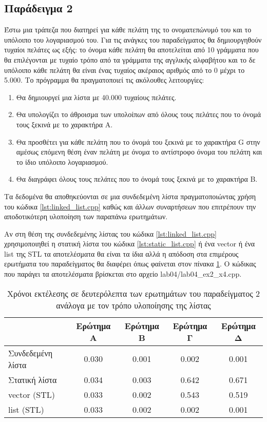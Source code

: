 \subsection{Παράδειγμα 2}
Έστω μια τράπεζα που διατηρεί για κάθε πελάτη της το ονοματεπώνυμό του και το υπόλοιπο του λογαριασμού του. Για τις ανάγκες του παραδείγματος θα δημιουργηθούν τυχαίοι πελάτες ως εξής: το όνομα κάθε πελάτη θα αποτελείται από 10 γράμματα που θα επιλέγονται με τυχαίο τρόπο από τα γράμματα της αγγλικής αλφαβήτου και το δε υπόλοιπο κάθε πελάτη θα είναι ένας τυχαίος ακέραιος αριθμός από το 0 μέχρι το 5.000. Το πρόγραμμα θα πραγματοποιεί τις ακόλουθες λειτουργίες: 
\begin{enumerate}[noitemsep,label=\Alph*]
\item Θα δημιουργεί μια λίστα με 40.000 τυχαίους πελάτες.
\item Θα υπολογίζει το άθροισμα των υπολοίπων από όλους τους πελάτες που το όνομά τους ξεκινά με το χαρακτήρα Α.
\item Θα προσθέτει για κάθε πελάτη που το όνομά του ξεκινά με το χαρακτήρα G στην αμέσως επόμενη θέση έναν πελάτη με όνομα το αντίστροφο όνομα του πελάτη και το ίδιο υπόλοιπο λογαριασμού.
\item Θα διαγράφει όλους τους πελάτες που το όνομά τους ξεκινά με το χαρακτήρα Β.
\end{enumerate}
Τα δεδομένα θα αποθηκεύονται σε μια συνδεδεμένη λίστα πραγματοποιώντας χρήση του κώδικα \ref{lst:linked_list.cpp} καθώς και άλλων συναρτήσεων που επιτρέπουν την αποδοτικότερη υλοποίηση των παραπάνω ερωτημάτων.





Αν στη θέση της συνδεδεμένης λίστας του κώδικα \ref{lst:linked_list.cpp} χρησιμοποιηθεί η στατική λίστα του κώδικα \ref{lst:static_list.cpp} ή ένα vector ή ένα list της STL τα αποτελέσματα θα είναι τα ίδια αλλά η απόδοση στα επιμέρους ερωτήματα του παραδείγματος θα διαφέρει όπως φαίνεται στον πίνακα \ref{tbl:lists}. Ο κώδικας που παράγει τα αποτελέσματα βρίσκεται στο αρχείο lab04/lab04\_ex2\_x4.cpp.

\begin{table}[!htb]
\centering
\begin{tabular}{|l|c|c|c|c|}
\hline
            & Ερώτημα A     & Ερώτημα B     & Ερώτημα Γ     & Ερώτημα Δ     \\ \hline
Συνδεδεμένη  λίστα & 0.030 & 0.001 & 0.002 & 0.001 \\ \hline
Στατική λίστα  & 0.034 & 0.003 & 0.642 & 0.671 \\ \hline
vector (STL)     & 0.033 & 0.002 & 0.543 & 0.519 \\ \hline
list (STL)       & 0.033 & 0.002 & 0.002 & 0.001 \\ \hline
\end{tabular}
\caption{Χρόνοι εκτέλεσης σε δευτερόλεπτα των ερωτημάτων του παραδείγματος 2 ανάλογα με τον τρόπο υλοποίησης της λίστας}
\label{tbl:lists}
\end{table}



